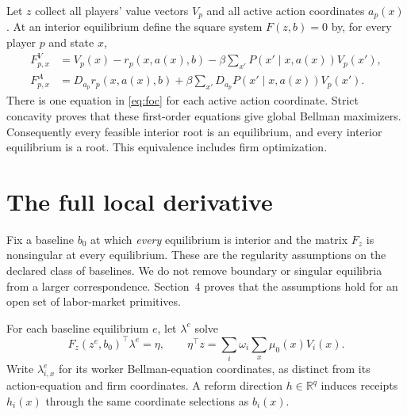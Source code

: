 \documentclass[11pt]{article}
\newcommand{\R}{\mathbb R}
\begin{document}
Let $z$ collect all players' value vectors $V_p$ and all active action coordinates $a_p(x)$. At an interior equilibrium define the square system $F(z,b)=0$ by, for every player $p$ and state $x$,
\begin{align}
 F^V_{p,x}&=V_p(x)-r_p(x,a(x),b)
              -\beta\sum_{x'}P(x'\mid x,a(x))V_p(x'),\label{eq:bellman}\\
 F^A_{p,x}&=D_{a_p}r_p(x,a(x),b)
              +\beta\sum_{x'}D_{a_p}P(x'\mid x,a(x))V_p(x').\label{eq:foc}
\end{align}
There is one equation in \eqref{eq:foc} for each active action coordinate. Strict concavity proves that these first-order equations give global Bellman maximizers. Consequently every feasible interior root is an equilibrium, and every interior equilibrium is a root. This equivalence includes firm optimization.

\section{The full local derivative}
Fix a baseline $b_0$ at which \emph{every} equilibrium is interior and the matrix $F_z$ is nonsingular at every equilibrium. These are the regularity assumptions on the declared class of baselines. We do not remove boundary or singular equilibria from a larger correspondence. Section~4 proves that the assumptions hold for an open set of labor-market primitives.

For each baseline equilibrium $e$, let $\lambda^e$ solve
\begin{equation}\label{eq:adjoint}
 F_z(z^e,b_0)^\top\lambda^e=\eta,\qquad
 \eta^\top z=\sum_i\omega_i\sum_x\mu_0(x)V_i(x).
\end{equation}
Write $\lambda^e_{i,x}$ for its worker Bellman-equation coordinates, as distinct from its action-equation and firm coordinates. A reform direction $h\in\R^q$ induces receipts $h_i(x)$ through the same coordinate selections as $b_i(x)$.
\end{document}
